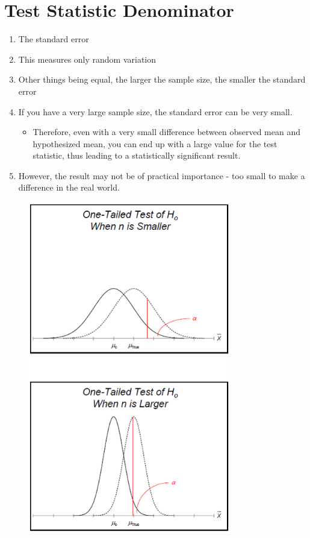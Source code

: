 \documentclass[12pt]{article}
\begin{document}
\section{Test Statistic Denominator}\label{test-statistic-denominator}

\begin{enumerate}
\def\labelenumi{\arabic{enumi}.}
\itemsep1pt\parskip0pt
\item
  The standard error
\item
  This measures only random variation
\item
  Other things being equal, the larger the sample size, the smaller the
  standard error
\item
  If you have a very large sample size, the standard error can be very
  small.

  \begin{itemize}
  \itemsep1pt\parskip0pt
  \item
    Therefore, even with a very small difference between observed mean
    and hypothesized mean, you can end up with a large value for the
    test statistic, thus leading to a statistically significant result.
  \end{itemize}
\item
  However, the result may not be of practical importance - too small to
  make a difference in the real world.
\end{enumerate}

\begin{figure}[H]
\centering
\includegraphics[width=3.5in]{prac_den.png}
\caption{}
\end{figure}
\end{document}
